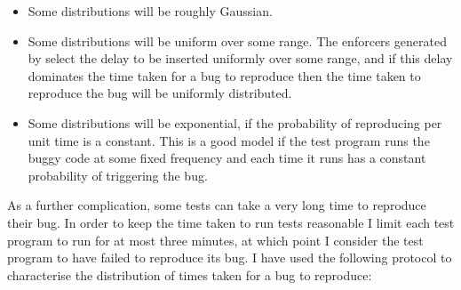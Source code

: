 \begin{itemize}
\item
  Some distributions will be roughly Gaussian.
\item
  Some distributions will be uniform over some range.  The enforcers
  generated by {\technique} select the delay to be inserted uniformly
  over some range, and if this delay dominates the time taken for
  a bug to reproduce then the time taken to reproduce the bug will be
  uniformly distributed.
\item
  Some distributions will be exponential, if the probability of
  reproducing per unit time is a constant.  This is a good model if
  the test program runs the buggy code at some fixed frequency and
  each time it runs has a constant probability of triggering the bug.
\end{itemize}
 
As a further complication, some tests can take a very long time to
reproduce their bug.  In order to keep the time taken to run tests
reasonable I limit each test program to run for at most three minutes,
at which point I consider the test program to have failed to reproduce
its bug.  I have used the following protocol to characterise the
distribution of times taken for a bug to reproduce:

